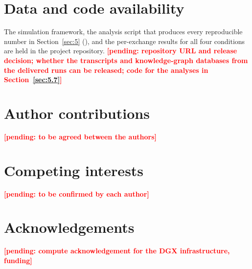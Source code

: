 \documentclass[11pt,a4paper]{article}
\newcommand{\pending}[1]{\textcolor{red}{\textbf{[#1]}}}
\begin{document}
\section*{Data and code availability}

The simulation framework, the analysis script that produces every reproducible
number in Section~\ref{sec:5} (), and
the per-exchange results for all four conditions are held in the project
repository. \pending{pending: repository URL and release decision; whether the
transcripts and knowledge-graph databases from the delivered runs can be
released; code for the analyses in Section~\ref{sec:5.7}}

\section*{Author contributions}

\pending{pending: to be agreed between the authors}

\section*{Competing interests}

\pending{pending: to be confirmed by each author}

\section*{Acknowledgements}

\pending{pending: compute acknowledgement for the DGX infrastructure, funding}




\end{document}

